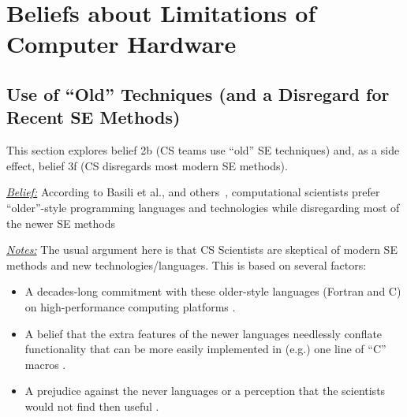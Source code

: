 \documentclass[sigconf]{acmart}
\begin{document}







\section{Beliefs about Limitations of Computer Hardware}


\subsection{Use of ``Old'' Techniques (and a Disregard for  Recent SE Methods)}\label{lang}
This section explores belief 2b (CS teams use ``old'' SE techniques)
and, as a side effect, belief 3f (CS disregards most modern SE methods).

\noindent \textit{\underline{Belief:}} According to Basili et al., and others~\cite{basili08_hpc, carver07_environment, Prabhu11_cssurvey, kendall05_C, ragan14_pythoncs},
computational scientists prefer
``older''-style programming languages and technologies while disregarding most of the newer SE methods

\noindent \textit{\underline{Notes:}} The usual argument here is that CS Scientists are skeptical of modern SE methods and new technologies/languages.
This is based on several factors: 
\begin{itemize}
  \item A decades-long commitment with these older-style languages (Fortran and C) on high-performance computing platforms \cite{faulk09_secs}.
  \item A belief that the extra features of the newer languages needlessly conflate functionality that can be more easily implemented in (e.g.) one line of ``C'' macros \cite{sanders08_risk}. 
  \item A prejudice against the never languages or a perception that the scientists would not find then useful \cite{Prabhu11_cssurvey}. 
\end{itemize}
\end{document}
